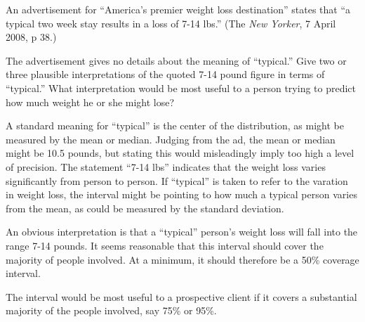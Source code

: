 
An advertisement for ``America's premier weight loss destination''
states that ``a typical two week stay results in a loss of 7-14 lbs.''
(The {\em New Yorker}, 7 April 2008, p 38.)  

The advertisement gives no details about the meaning of ``typical.''
Give two or three plausible interpretations of the quoted 7-14 pound
figure in terms of ``typical.''  What interpretation would be most
useful to a person trying to predict how much weight he or she might
lose?

\TextEntry


\begin{AnswerText}
A standard meaning for ``typical'' is the center of the distribution,
as might be measured by the mean or median.  Judging from the ad, the
mean or median might be 10.5 pounds, but stating this would
misleadingly imply too high a level of precision.  The statement
``7-14 lbs'' indicates that the weight loss varies significantly from person to
person.  If ``typical'' is taken to refer to the varation in weight
loss, the interval might be pointing to how much a typical person
varies from the mean, as could be measured by the standard deviation.  

An obvious interpretation is that a ``typical'' person's weight
loss will fall into the range 7-14 pounds.  It seems reasonable that
this interval should cover the majority of people involved.  At a
minimum, it should therefore be a 50\% coverage interval.

The interval would be most useful to a prospective client if it covers
a substantial majority of the people involved, say 75\% or 95\%.

\end{AnswerText}